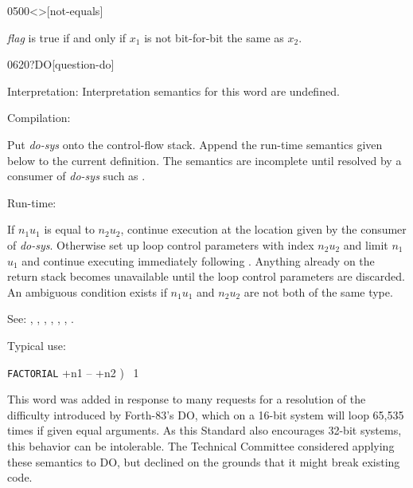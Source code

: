 \begin{newword}[ne]{0500}{<>}[not-equals]

	\emph{flag} is true if and only if $x_1$ is not bit-for-bit the
	same as $x_2$.
\end{newword}


\begin{newword*}{0620}{?DO}[question-do]
\item[Interpretation:]
	Interpretation semantics for this word are undefined.

\item[Compilation:]

	Put \emph{do-sys} onto the control-flow stack. Append the
	run-time semantics given below to the current definition. The
	semantics are incomplete until resolved by a consumer of
	\emph{do-sys} such as .

\item[Run-time:]

	If $n_1$\textbar$u_1$ is equal to $n_2$\textbar$u_2$,
	continue execution at the location given by the consumer of
	\emph{do-sys}. Otherwise set up loop control parameters with
	index $n_2$\textbar$u_2$ and limit $n_1$\textbar$u_1$ and
	continue executing immediately following . Anything
	already on the return stack becomes unavailable until the loop
	control parameters are discarded. An ambiguous condition exists
	if $n_1$\textbar$u_1$ and $n_2$\textbar$u_2$ are not both of
	the same type.

\item[See:]
	,
	,
	,
	,
	,
	,
	.

	\begin{rationale} %
		Typical use:

		\tab \word{:} \texttt{FACTORIAL}  +n1 -- +n2 )~
			1   ~
				 \word{*}~
		\word{;}

		This word was added in response to many requests for a
		resolution of the difficulty introduced by Forth-83's DO,
		which on a 16-bit system will loop 65,535 times if given
		equal arguments. As this Standard also encourages 32-bit
		systems, this behavior can be intolerable. The Technical
		Committee considered applying these semantics to DO, but
		declined on the grounds that it might break existing code.
	\end{rationale}
\end{newword*}


